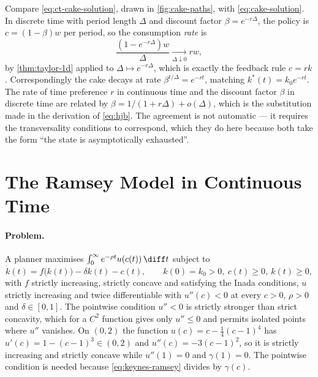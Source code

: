 \begin{remark}\label{rem:ct-discrete-limit}
	Compare \eqref{eq:ct-cake-solution}, drawn in \autoref{fig:cake-paths}, with
	\eqref{eq:cake-solution}. In discrete
	time with period length $\Delta$ and discount factor
	$\beta=e^{-r\Delta}$, the policy is $c=(1-\beta)w$ per period, so the
	consumption \emph{rate} is
	\[
		\frac{(1-e^{-r\Delta})w}{\Delta}\xrightarrow[\Delta\downarrow0]{}rw,
	\]
	by \autoref{thm:taylor-1d} applied to $\Delta\mapsto e^{-r\Delta}$, which is
	exactly the feedback rule $c=rk$. Correspondingly the cake decays at rate
	$\beta^{t/\Delta}=e^{-rt}$, matching $k^{\ast}(t)=k_0e^{-rt}$. The rate of time
	preference $r$ in continuous time and the discount factor $\beta$ in discrete
	time are related by $\beta=1/(1+r\Delta)+o(\Delta)$, which is the substitution
	made in the derivation of \eqref{eq:hjb}. The agreement is not automatic --- it
	requires the transversality conditions to correspond, which they do here
	because both take the form ``the state is asymptotically exhausted''.
\end{remark}

\section{The Ramsey Model in Continuous Time}\label{sec:ct-ramsey}

\paragraph{Problem.} A planner maximises
$\int_0^{\infty}e^{-\rho t}u(c(t))\,\diff t$ subject to
\begin{equation}\label{eq:ct-ramsey-constraint}
	\dot k(t)=f\bigl(k(t)\bigr)-\delta k(t)-c(t),
	\qquad k(0)=k_0>0,\ c(t)\geq0,\ k(t)\geq0,
\end{equation}
with $f$ strictly increasing, strictly concave and satisfying the Inada
conditions, $u$ strictly increasing and twice differentiable with $u''(c)<0$ at
every $c>0$, $\rho>0$ and $\delta\in[0,1]$. The pointwise condition $u''<0$ is
strictly stronger than strict concavity, which for a $C^{2}$ function gives only
$u''\leq0$ and permits isolated points where $u''$ vanishes. On $(0,2)$ the
function $u(c)=c-\tfrac14(c-1)^{4}$ has $u'(c)=1-(c-1)^{3}\in(0,2)$ and
$u''(c)=-3(c-1)^{2}$, so it is strictly increasing and strictly concave while
$u''(1)=0$ and $\gamma(1)=0$. The pointwise condition is needed because
\eqref{eq:keynes-ramsey} divides by $\gamma(c)$.

